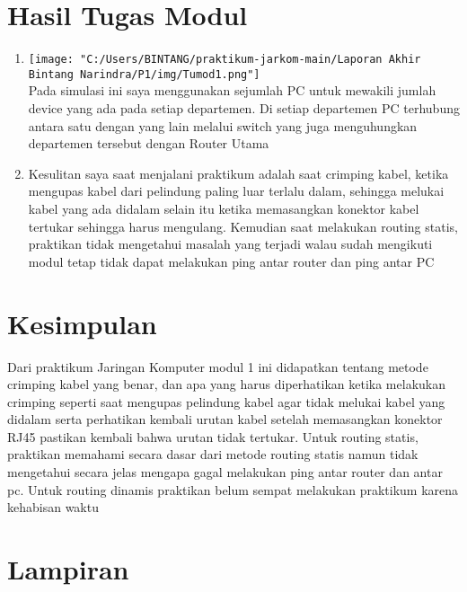 \section{Hasil Tugas Modul}
\begin{enumerate}
	\item \texttt{[image: "C:/Users/BINTANG/praktikum-jarkom-main/Laporan Akhir Bintang Narindra/P1/img/Tumod1.png"]}\\
	Pada simulasi ini saya menggunakan sejumlah PC untuk mewakili jumlah device yang ada pada setiap departemen. Di setiap departemen PC terhubung antara satu dengan yang lain melalui switch yang juga menguhungkan departemen tersebut dengan Router Utama
	\item Kesulitan saya saat menjalani praktikum adalah saat crimping kabel, ketika mengupas kabel dari pelindung paling luar terlalu dalam, sehingga melukai kabel yang ada didalam selain itu ketika memasangkan konektor kabel tertukar sehingga harus mengulang. Kemudian saat melakukan routing statis, praktikan tidak mengetahui masalah yang terjadi walau sudah mengikuti modul tetap tidak dapat melakukan ping antar router dan ping antar PC
\end{enumerate}

\section{Kesimpulan}
Dari praktikum Jaringan Komputer modul 1 ini didapatkan tentang metode crimping kabel yang benar, dan apa yang harus diperhatikan ketika melakukan crimping seperti saat mengupas pelindung kabel agar tidak melukai kabel yang didalam serta perhatikan kembali urutan kabel setelah memasangkan konektor RJ45 pastikan kembali bahwa urutan tidak tertukar. Untuk routing statis, praktikan memahami secara dasar dari metode routing statis namun tidak mengetahui secara jelas mengapa gagal melakukan ping antar router dan antar pc. Untuk routing dinamis praktikan belum sempat melakukan praktikum karena kehabisan waktu

\section{Lampiran}
